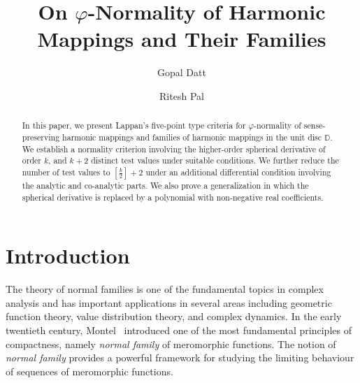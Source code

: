 \documentclass[11pt, reqno]{amsart}
\numberwithin{equation}{section}
\theoremstyle{definition}
\theoremstyle{remark}
\theoremstyle{plain}
\begin{document}
\title[On $\varphi$-Normality of Harmonic Mappings and Their Families]{On $\varphi$-Normality of Harmonic Mappings and Their Families}

\author{Gopal Datt}
\address{Department of Mathematics, Babasaheb Bhimrao Ambedkar University, Lucknow, India}
\author{Ritesh Pal}
\address{Department of Mathematics, Babasaheb Bhimrao Ambedkar University, Lucknow, India}







\begin{abstract}
In this paper, we present Lappan's five-point type criteria for 
$\varphi$-normality of sense-preserving harmonic mappings
and families of harmonic mappings in the unit disc $\mathbb{D}$.
We establish a normality criterion involving the 
higher-order spherical derivative of order $k$, and $k+2$ distinct 
test values under suitable conditions. We further reduce the 
number of test values to $\left[\frac{k}{2}\right]+2$ under an 
additional  differential condition involving the analytic and co-analytic 
parts. We also prove a generalization in which the 
spherical derivative is replaced by a polynomial with non-negative
real coefficients. 
\end{abstract}

\maketitle
\section{Introduction}

The theory of normal families is one of the fundamental
topics in complex analysis and has  important  applications in several 
areas including geometric function theory,
value distribution theory, and complex dynamics. In the early
twentieth century, Montel~\cite{Montel1912} introduced one of the 
most fundamental principles of compactness, namely {\it normal 
family} of meromorphic functions. The notion
of {\it normal family} provides a powerful framework
for studying the limiting behaviour of sequences of meromorphic
functions.
\smallskip
\end{document}

